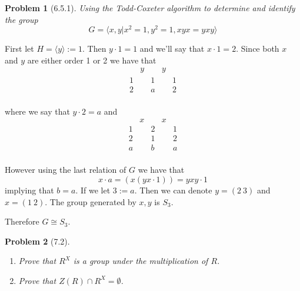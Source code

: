 \documentclass[10pt]{article}
\newcommand{\sk}{\vskip 10mm}
\theoremstyle{plain}
\newtheorem{problem}{Problem}
\theoremstyle{remark}
\begin{document}
\sk

\begin{problem}[6.5.1]
  Using the Todd-Coxeter algorithm to determine and identify the group
  \[ G = \langle x,y| x^2=1,y^2=1, xyx=yxy\rangle \]
\end{problem}

First let $H=\langle y\rangle:= 1$. Then $y\cdot 1 = 1$ and we'll say that
$x\cdot 1 = 2$. Since both $x$ and $y$ are either order 1 or 2 we
have that
\[
  \begin{array}{ccccc}
    &y&&y&\\
    \hline    
    1 &&1&&1\\
    2&&a&&2\\
  \end{array}
\]

where we say that $y\cdot 2=a$ and
\[
  \begin{array}{ccccc}
    &x&&x&\\
    \hline
    1&&2&&1\\
    2&&1&&2\\
    a&&b&&a\\
  \end{array}
\]

However using the last relation of $G$ we have that
\[x\cdot a=(x(yx\cdot 1))=yxy\cdot 1\]
implying that $b=a$. If we let $3:=a$. Then we can
denote $y=(2\ 3)$ and $x=(1\ 2)$. The group generated
by $x,y$ is $S_3$.

Therefore $G\cong S_3$.

\sk

\begin{problem}[7.2]
  \begin{enumerate}
  \item Prove that $R^X$ is a group under the multiplication of $R$.
  \item Prove that $Z(R)\cap R^X=\emptyset$.
  \end{enumerate}
\end{problem}
\end{document}
